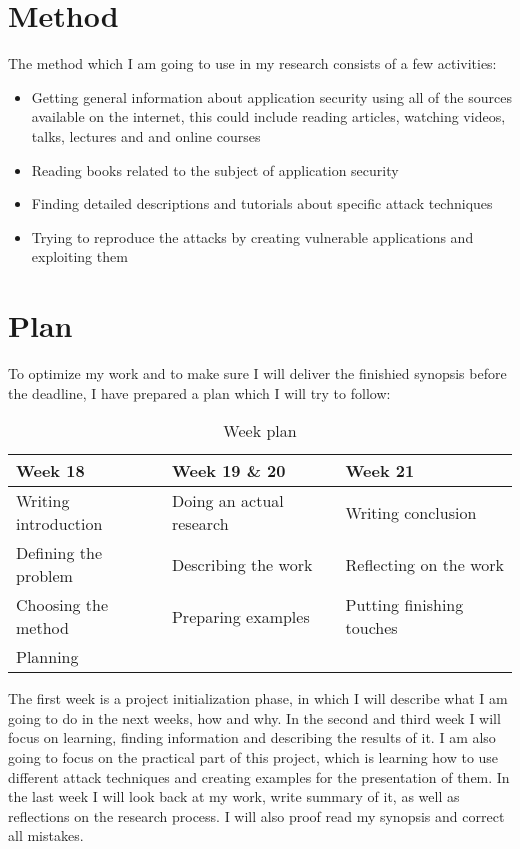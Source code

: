 \documentclass[a4paper]{article}
\begin{document}
\section{Method}

The method which I am going to use in my research consists of a few activities:
\begin{itemize}
	\item Getting general information about application security using all of the sources available on the internet, this could include reading articles, watching videos, talks, lectures and and online courses
	\item Reading books related to the subject of application security
	\item Finding detailed descriptions and tutorials about specific attack techniques
	\item Trying to reproduce the attacks by creating vulnerable applications and exploiting them
\end{itemize}

\section{Plan}

To optimize my work and to make sure I will deliver the finishied synopsis before the deadline, I have prepared a plan which I will try to follow:

\begin{table}[h]
	\centering
	\begin{tabular}{@{}lll@{}}
		\toprule
		Week 18              & Week 19 \& 20            & Week 21                   \\ \midrule
		Writing introduction & Doing an actual research & Writing conclusion        \\
		Defining the problem & Describing the work      & Reflecting on the work    \\
		Choosing the method  & Preparing examples       & Putting finishing touches \\
		Planning             &                          &                           \\ \bottomrule
	\end{tabular}
	\caption{Week plan}
	\label{my-label}
\end{table}

The first week is a project initialization phase, in which I will describe what I am going to do in the next weeks, how and why. In the second and third week I will focus on learning, finding information and describing the results of it. I am also going to focus on the practical part of this project, which is learning how to use different attack techniques and creating examples for the presentation of them. In the last week I will look back at my work, write summary of it, as well as reflections on the research process. I will also proof read my synopsis and correct all mistakes.
\end{document}
